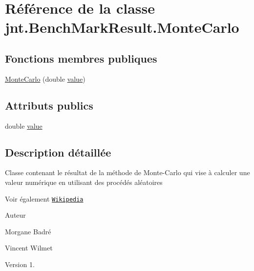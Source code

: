 \hypertarget{classjnt_1_1BenchMarkResult_1_1MonteCarlo}{\section{Référence de la classe jnt.\-Bench\-Mark\-Result.\-Monte\-Carlo}
\label{classjnt_1_1BenchMarkResult_1_1MonteCarlo}
}
\subsection*{Fonctions membres publiques}
\begin{DoxyCompactItemize}
\item 
\hyperlink{classjnt_1_1BenchMarkResult_1_1MonteCarlo_ac9d30269affcce1616c18ae32207300c}{Monte\-Carlo} (double \hyperlink{classjnt_1_1BenchMarkResult_1_1MonteCarlo_ab2a4abf12262da8dd3141f30bb2d4c8a}{value})
\end{DoxyCompactItemize}
\subsection*{Attributs publics}
\begin{DoxyCompactItemize}
\item 
double \hyperlink{classjnt_1_1BenchMarkResult_1_1MonteCarlo_ab2a4abf12262da8dd3141f30bb2d4c8a}{value}
\end{DoxyCompactItemize}


\subsection{Description détaillée}
Classe contenant le résultat de la méthode de Monte-\/\-Carlo qui vise à calculer une valeur numérique en utilisant des procédés aléatoires \begin{DoxySeeAlso}{Voir également}
\href{http://fr.wikipedia.org/wiki/M%C3%A9thode_de_Monte-Carlo}{\tt Wikipedia} 
\end{DoxySeeAlso}
\begin{DoxyAuthor}{Auteur}

\begin{DoxyItemize}
\item Morgane Badré 
\item Vincent Wilmet 
\end{DoxyItemize}
\end{DoxyAuthor}
\begin{DoxyVersion}{Version}
1. 
\end{DoxyVersion}


